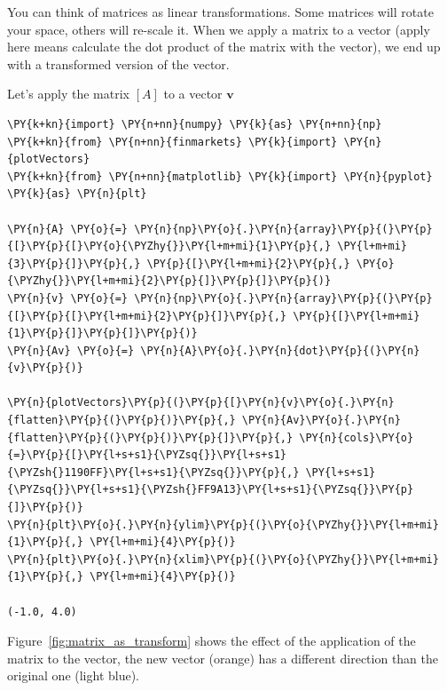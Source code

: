 You can think of matrices as linear transformations. Some matrices will
rotate your space, others will re-scale it. When we apply a matrix to a
vector (apply here means calculate the
dot product of the matrix with the vector), we end up with a transformed version of the vector.

Let's apply the matrix \([A]\) to a vector $\mathbf{v}$

\begin{tcolorbox}[breakable, size=fbox, boxrule=1pt, pad at break*=1mm,colback=cellbackground, colframe=cellborder]
\begin{Verbatim}[commandchars=\\\{\}]
\PY{k+kn}{import} \PY{n+nn}{numpy} \PY{k}{as} \PY{n+nn}{np}
\PY{k+kn}{from} \PY{n+nn}{finmarkets} \PY{k}{import} \PY{n}{plotVectors}
\PY{k+kn}{from} \PY{n+nn}{matplotlib} \PY{k}{import} \PY{n}{pyplot} \PY{k}{as} \PY{n}{plt}
	
\PY{n}{A} \PY{o}{=} \PY{n}{np}\PY{o}{.}\PY{n}{array}\PY{p}{(}\PY{p}{[}\PY{p}{[}\PY{o}{\PYZhy{}}\PY{l+m+mi}{1}\PY{p}{,} \PY{l+m+mi}{3}\PY{p}{]}\PY{p}{,} \PY{p}{[}\PY{l+m+mi}{2}\PY{p}{,} \PY{o}{\PYZhy{}}\PY{l+m+mi}{2}\PY{p}{]}\PY{p}{]}\PY{p}{)}
\PY{n}{v} \PY{o}{=} \PY{n}{np}\PY{o}{.}\PY{n}{array}\PY{p}{(}\PY{p}{[}\PY{p}{[}\PY{l+m+mi}{2}\PY{p}{]}\PY{p}{,} \PY{p}{[}\PY{l+m+mi}{1}\PY{p}{]}\PY{p}{]}\PY{p}{)}	
\PY{n}{Av} \PY{o}{=} \PY{n}{A}\PY{o}{.}\PY{n}{dot}\PY{p}{(}\PY{n}{v}\PY{p}{)}
	
\PY{n}{plotVectors}\PY{p}{(}\PY{p}{[}\PY{n}{v}\PY{o}{.}\PY{n}{flatten}\PY{p}{(}\PY{p}{)}\PY{p}{,} \PY{n}{Av}\PY{o}{.}\PY{n}{flatten}\PY{p}{(}\PY{p}{)}\PY{p}{]}\PY{p}{,} \PY{n}{cols}\PY{o}{=}\PY{p}{[}\PY{l+s+s1}{\PYZsq{}}\PY{l+s+s1}{\PYZsh{}1190FF}\PY{l+s+s1}{\PYZsq{}}\PY{p}{,} \PY{l+s+s1}{\PYZsq{}}\PY{l+s+s1}{\PYZsh{}FF9A13}\PY{l+s+s1}{\PYZsq{}}\PY{p}{]}\PY{p}{)}
\PY{n}{plt}\PY{o}{.}\PY{n}{ylim}\PY{p}{(}\PY{o}{\PYZhy{}}\PY{l+m+mi}{1}\PY{p}{,} \PY{l+m+mi}{4}\PY{p}{)}
\PY{n}{plt}\PY{o}{.}\PY{n}{xlim}\PY{p}{(}\PY{o}{\PYZhy{}}\PY{l+m+mi}{1}\PY{p}{,} \PY{l+m+mi}{4}\PY{p}{)}

(-1.0, 4.0)
\end{Verbatim}
\end{tcolorbox}

Figure~\ref{fig:matrix_as_transform} shows the effect of the application of the matrix to the vector, the new vector (orange) has a different direction than the original one (light blue).

